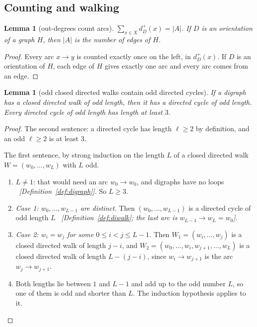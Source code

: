 \documentclass[11pt]{article}
\theoremstyle{plain}
\newtheorem{lemma}[theorem]{Lemma}
\theoremstyle{definition}
\theoremstyle{remark}
\newcommand{\dout}{d^{+}}
\newcommand{\why}[1]{\unskip\ \textit{[#1]}}
\newenvironment{steps}{\begin{enumerate}[label=(\arabic*),leftmargin=2.2em,itemsep=0.35em]}{\end{enumerate}}
\begin{document}
\subsection{Counting and walking}

\begin{lemma}[out-degrees count arcs]\label{lem:sum-outdeg}
$\sum_{x\in X}\dout_D(x)=|A|$. If $D$ is an orientation of a graph $H$, then $|A|$ is the number
of edges of $H$.
\end{lemma}

\begin{proof}
Every arc $x\to y$ is counted exactly once on the left, in $\dout_D(x)$. If $D$ is an
orientation of $H$, each edge of $H$ gives exactly one arc and every arc comes from an edge.
\end{proof}

\begin{lemma}[odd closed directed walks contain odd directed cycles]\label{lem:odd-diwalk}
If a digraph has a closed directed walk of odd length, then it has a directed cycle of odd
length. Every directed cycle of odd length has length at least $3$.
\end{lemma}

\begin{proof}
The second sentence: a directed cycle has length $\ell\ge 2$ by definition, and an odd
$\ell\ge 2$ is at least $3$.

The first sentence, by strong induction on the length $L$ of a closed directed walk
$W=(w_0,\dots,w_L)$ with $L$ odd.
\begin{steps}
  \item $L\ne 1$: that would need an arc $w_0\to w_0$, and digraphs have no loops
    \why{Definition~\ref{def:digraph}}. So $L\ge 3$.
  \item \emph{Case 1: $w_0,\dots,w_{L-1}$ are distinct.} Then $(w_0,\dots,w_{L-1})$ is a
    directed cycle of odd length $L$ \why{Definition~\ref{def:diwalk}; the last arc is
    $w_{L-1}\to w_L=w_0$}.
  \item \emph{Case 2: $w_i=w_j$ for some $0\le i<j\le L-1$.} Then
    $W_1=(w_i,\dots,w_j)$ is a closed directed walk of length $j-i$, and
    $W_2=(w_0,\dots,w_i,w_{j+1},\dots,w_L)$ is a closed directed walk of length $L-(j-i)$, since
    $w_i\to w_{j+1}$ is the arc $w_j\to w_{j+1}$.
  \item Both lengths lie between $1$ and $L-1$ and add up to the odd number $L$, so one of them
    is odd and shorter than $L$. The induction hypothesis applies to it. \qedhere
\end{steps}
\end{proof}
\end{document}
